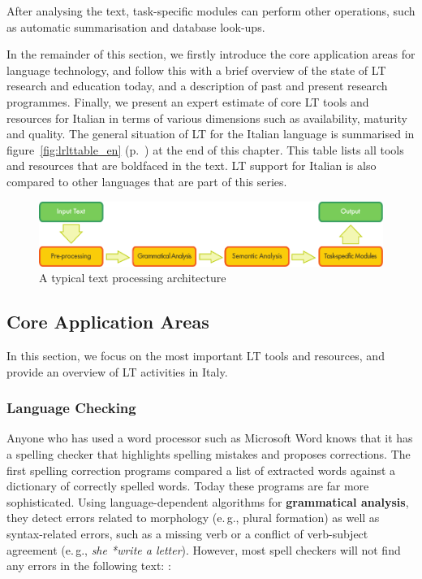 \begin{multicols}{2}
After analysing the text, task-specific modules can perform other operations,
such as automatic summarisation and database look-ups.

In the remainder of this section, we firstly introduce the core application areas for language technology, and follow this with a brief overview of the state of LT research and education today, and a description of past and present research programmes. Finally, we present an expert estimate of core LT tools and resources for Italian in terms of various dimensions such as availability, maturity and quality. The general situation of LT for the Italian language is summarised in figure~\ref{fig:lrlttable_en} (p.~\pageref{fig:lrlttable_en}) at the end of this chapter. This table lists all tools and resources that are boldfaced in the text. LT support for Italian is also compared to other languages that are part of this series.

\begin{figure}[htb]
  \center
  \includegraphics[width=\textwidth]{../_media/english/text_processing_app_architecture}
  \caption{A typical text processing architecture}
  \label{fig:textprocessingarch_en}
\end{figure}

\subsection{Core Application Areas}

In this section, we focus on the most important LT tools and resources, and
provide an overview of LT activities in Italy. 

\subsubsection{Language Checking}

Anyone who has used a word processor such as Microsoft Word knows that it has a spelling checker that highlights spelling mistakes and proposes corrections. The first spelling correction programs compared a list of extracted words against a dictionary of correctly spelled words. Today these programs are far more sophisticated. Using language-dependent algorithms for \textbf{grammatical analysis}, they detect errors related to morphology (e.\,g., plural formation) as well as syntax-related errors, such as a missing verb or a conflict of verb-subject agreement (e.\,g., \emph{she *write a letter}). However, most spell checkers will not find any errors in the following text: \cite{zar1}:


\end{multicols}
